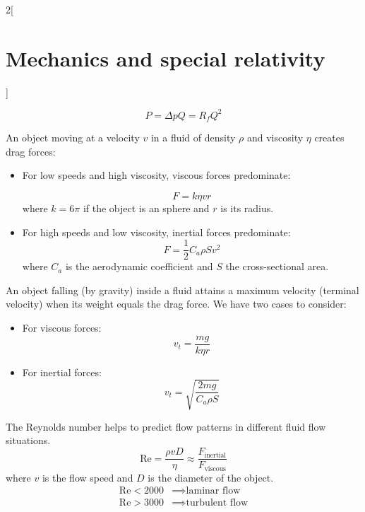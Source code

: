 \documentclass[../../../main.tex]{subfiles}
\begin{document}
\begin{multicols}{2}[\section{Mechanics and special relativity}]
\begin{prop}
    $$P=\Delta pQ=R_fQ^2$$
  \end{prop}
  \begin{prop}
    An object moving at a velocity $v$ in a fluid of density $\rho$ and viscosity $\eta$ creates drag forces:
    \begin{itemize}
      \item For low speeds and high viscosity, viscous forces predominate:\par
            $$F=k\eta vr$$
            where $k=6\pi$ if the object is an sphere and $r$ is its radius.
      \item For high speeds and low viscosity, inertial forces predominate:
            $$F=\frac{1}{2}C_a\rho Sv^2$$
            where $C_a$ is the aerodynamic coefficient and $S$ the cross-sectional area.
    \end{itemize}
  \end{prop}
  \begin{prop}
    An object falling (by gravity) inside a fluid attains a maximum velocity (terminal velocity) when its weight equals the drag force. We have two cases to consider:
    \begin{itemize}
      \item For viscous forces: $$v_t=\frac{mg}{k\eta r}$$
      \item For inertial forces: $$v_t=\sqrt{\frac{2mg}{C_a\rho S}}$$
    \end{itemize}
  \end{prop}
  \begin{prop}
    The Reynolds number helps to predict flow patterns in different fluid flow situations.
    $$\text{Re}=\frac{\rho vD}{\eta}\approx\frac{F_{\text{inertial}}}{F_{\text{viscous}}}$$
    where $v$ is the flow speed and $D$ is the diameter of the object.
    \begin{align*}
      \text{Re}<2000 & \implies\text{laminar flow}   \\
      \text{Re}>3000 & \implies\text{turbulent flow}
    \end{align*}
  \end{prop}


\end{multicols}
\end{document}
